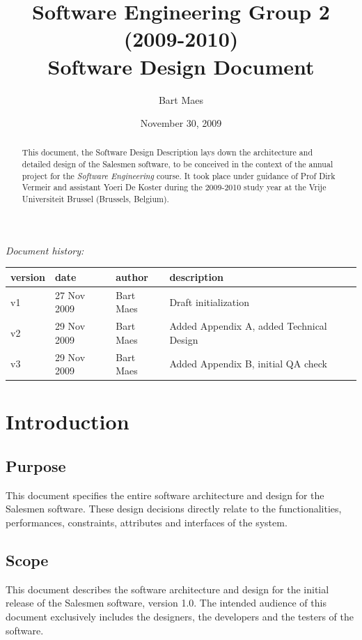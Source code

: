 \documentclass[a4paper, 12pt]{report}
\title{Software Engineering Group 2 (2009-2010) \\Software Design Document}
\author{Bart Maes}
\date {November 30, 2009}
\begin{document}
\maketitle

\thispagestyle{empty}



\begin{abstract}
This document, the Software Design Description lays down the architecture and detailed design of the Salesmen software, to be conceived in the context of the annual project for the \emph{Software Engineering} course. It took place under guidance of Prof Dirk Vermeir and assistant Yoeri De Koster during the 2009-2010 study year at the Vrije Universiteit Brussel (Brussels, Belgium).
\end{abstract}

\begin{center}
\emph{Document history:}\\
\begin{tabular}{llll}
version & date & author & description \\
\hline
v1 & 27 Nov 2009 & Bart Maes & Draft initialization \\
v2 & 29 Nov 2009 & Bart Maes & Added Appendix A, added Technical Design\\
v3 & 29 Nov 2009 & Bart Maes & Added Appendix B, initial QA check\\
\end{tabular}
\end{center}

\newpage
\tableofcontents
\newpage

\chapter{Introduction}

\section{Purpose}
   This document specifies the entire software architecture and design for the Salesmen software. These design decisions directly relate to the functionalities, performances, constraints, attributes and interfaces of the system.

\section{Scope}
    This document describes the software architecture and design for the initial release of the Salesmen software, version 1.0. The intended audience of this document exclusively includes the designers, the developers and the testers of the software.
\end{document}
